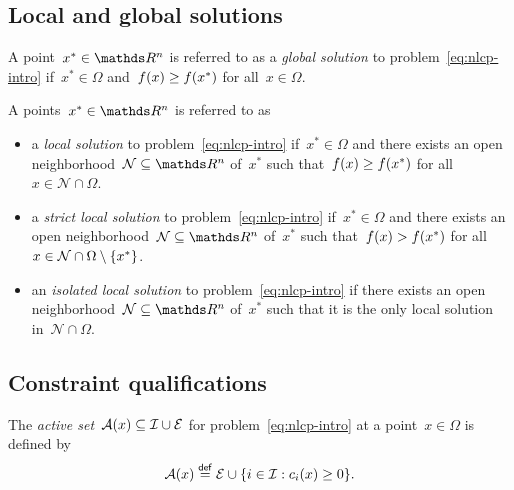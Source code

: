 \subsection{Local and global solutions}

\begin{definition}
    A point~$x^{\ast} \in \R^n$ is referred to as a \emph{global solution} to problem~\cref{eq:nlcp-intro} if~$x^{\ast} \in \Omega$ and~$f(x) \ge f(x^{\ast})$ for all~$x \in \Omega$.
\end{definition}

\begin{definition}
    A points~$x^{\ast} \in \R^n$ is referred to as
    \begin{itemize}
        \item a \emph{local solution} to problem~\cref{eq:nlcp-intro} if~$x^{\ast} \in \Omega$ and there exists an open neighborhood~$\mathcal{N} \subseteq \R^n$ of~$x^{\ast}$ such that~$f(x) \ge f(x^{\ast})$ for all~$x \in \mathcal{N} \cap \Omega$.
        \item a \emph{strict local solution} to problem~\cref{eq:nlcp-intro} if~$x^{\ast} \in \Omega$ and there exists an open neighborhood~$\mathcal{N} \subseteq \R^n$ of~$x^{\ast}$ such that~$f(x) > f(x^{\ast})$ for all~$x \in \mathcal{N} \cap \Omega \setminus \{x^{\ast}\}$.
        \item an \emph{isolated local solution} to problem~\cref{eq:nlcp-intro} if there exists an open neighborhood~$\mathcal{N} \subseteq \R^n$ of~$x^{\ast}$ such that it is the only local solution in~$\mathcal{N} \cap \Omega$.
    \end{itemize}
\end{definition}

\subsection{Constraint qualifications}

\begin{definition}
    The \emph{active set}~$\mathcal{A}(x) \subseteq \mathcal{I} \cup \mathcal{E}$ for problem~\cref{eq:nlcp-intro} at a point~$x \in \Omega$ is defined by
    \begin{equation*}
        \mathcal{A}(x) \mathrel{\stackrel{\mathsf{def}}{=}} \mathcal{E} \cup \{i \in \mathcal{I} : c_{i}(x) \ge 0\}.
    \end{equation*}
\end{definition}

